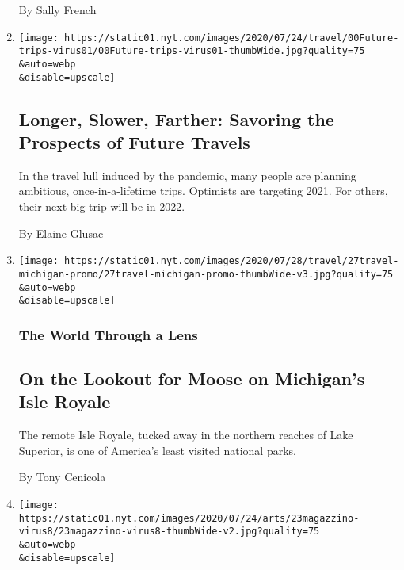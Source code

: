 \begin{enumerate}
  By Sally French
\item
  \href{/2020/07/28/travel/future-travel-bucket-list-coronavirus.html}{}

  \texttt{[image: https://static01.nyt.com/images/2020/07/24/travel/00Future-trips-virus01/00Future-trips-virus01-thumbWide.jpg?quality=75\\\&auto=webp\\\&disable=upscale]}

  \hypertarget{longer-slower-farther-savoring-the-prospects-of-future-travels}{%
  \subsection{Longer, Slower, Farther: Savoring the Prospects of Future
  Travels}\label{longer-slower-farther-savoring-the-prospects-of-future-travels}}

  In the travel lull induced by the pandemic, many people are planning
  ambitious, once-in-a-lifetime trips. Optimists are targeting 2021. For
  others, their next big trip will be in 2022.

  By Elaine Glusac
\item
  \href{/2020/07/27/travel/moose-michigan-isle-royale.html}{}

  \texttt{[image: https://static01.nyt.com/images/2020/07/28/travel/27travel-michigan-promo/27travel-michigan-promo-thumbWide-v3.jpg?quality=75\\\&auto=webp\\\&disable=upscale]}

  \hypertarget{the-world-through-a-lens-1}{%
  \subsubsection{The World Through a
  Lens}\label{the-world-through-a-lens-1}}

  \hypertarget{on-the-lookout-for-moose-on-michigans-isle-royale}{%
  \subsection{On the Lookout for Moose on Michigan's Isle
  Royale}\label{on-the-lookout-for-moose-on-michigans-isle-royale}}

  The remote Isle Royale, tucked away in the northern reaches of Lake
  Superior, is one of America's least visited national parks.

  By Tony Cenicola
\item
  \href{/2020/07/22/arts/design/magazzino-art-social-distancing-virus.html}{}

  \texttt{[image: https://static01.nyt.com/images/2020/07/24/arts/23magazzino-virus8/23magazzino-virus8-thumbWide-v2.jpg?quality=75\\\&auto=webp\\\&disable=upscale]}


\end{enumerate}
